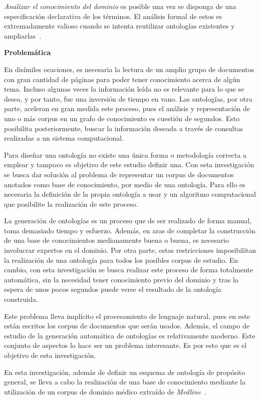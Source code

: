 \textit{Analizar el conocimiento del dominio} es posible una vez se disponga de una especificación declarativa de los términos. El análisis formal de estos es extremadamente valioso cuando se intenta reutilizar ontologías existentes y ampliarlas~\cite{ref:13}.

\noindent\textbf{\large Problemática}

En disímiles ocaciones, es necesaria la lectura de un amplio grupo de documentos con gran cantidad de páginas para poder tener conocimiento acerca de algún tema. Incluso algunas veces la información leída no es relevante para lo que se desea, y por tanto, fue una inversión de tiempo en vano. Las ontologías, por otra parte, aceleran en gran medida este proceso, pues el análisis y representación de uno o más corpus en un grafo de conocimiento es cuestión de segundos. Esto posibilita posteriormente, buscar la información deseada a través de consultas realizadas a un sistema computacional.

Para diseñar una ontología no existe una única forma o metodología correcta a emplear y tampoco es objetivo de este estudio definir una. Con esta investigación se busca dar solución al problema de representar un corpus de documentos anotados como base de conocimiento, por medio de una ontología. Para ello es necesaria la definición de la propia ontología a usar y un algoritmo computacional que posibilite la realización de este proceso.

La generación de ontologías es un proceso que de ser realizado de forma manual, toma demasiado tiempo y esfuerzo. Además, en aras de completar la construcción de una base de conocimientos medianamente buena o buena, es necesario involucrar expertos en el dominio. Por otra parte, estas restricciones imposibilitan la realización de una ontología para todos los posibles corpus de estudio. En cambio, con esta investigación se busca realizar este proceso de forma totalmente automática, sin la necesidad tener conocimiento previo del dominio y tras la espera de unos pocos segundos puede verse el resultado de la ontología construida.

Este problema lleva implícito el procesamiento de lenguaje natural, pues en este están escritos los corpus de documentos que serán usados. Además, el campo de estudio de la generación automática de ontologías es relativamente moderno. Este conjunto de aspectos lo hace ser un problema interesante. Es por esto que es el objetivo de esta investigación.

En esta investigación, además de definir un esquema de ontología de propósito general, se lleva a cabo la realización de una base de conocimiento mediante la utilización de un corpus de dominio médico extraído de \textit{Medline}~\cite{ref:3}.\\

